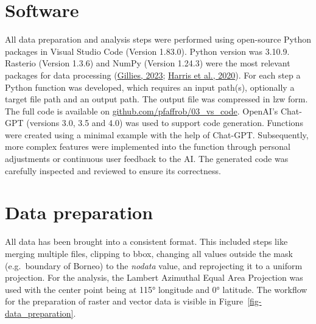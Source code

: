 \documentclass[
  letterpaper,
  DIV=11,
  numbers=noendperiod]{scrreprt}
\begin{document}
\hypertarget{software}{%
\section{Software}\label{software}}

All data preparation and analysis steps were performed using open-source
Python packages in Visual Studio Code (Version 1.83.0). Python version
was 3.10.9. Rasterio (Version 1.3.6) and NumPy (Version 1.24.3) were the
most relevant packages for data processing
(\protect\hyperlink{ref-gilliesRasterioDocumentation2023}{Gillies,
2023}; \protect\hyperlink{ref-harrisArrayProgrammingNumPy2020}{Harris et
al., 2020}). For each step a Python function was developed, which
requires an input path(s), optionally a target file path and an output
path. The output file was compressed in lzw form. The full code is
available on
\href{https://github.com/pfaffrob/03_vs_code}{github.com/pfaffrob/03\_vs\_code}.
OpenAI's Chat-GPT (versions 3.0, 3.5 and 4.0) was used to support code
generation. Functions were created using a minimal example with the help
of Chat-GPT. Subsequently, more complex features were implemented into
the function through personal adjustments or continuous user feedback to
the AI. The generated code was carefully inspected and reviewed to
ensure its correctness.

\hypertarget{data-preparation}{%
\section{Data preparation}\label{data-preparation}}

All data has been brought into a consistent format. This included steps
like merging multiple files, clipping to bbox, changing all values
outside the mask (e.g.~boundary of Borneo) to the \emph{nodata} value,
and reprojecting it to a uniform projection. For the analysis, the
Lambert Azimuthal Equal Area Projection was used with the center point
being at 115° longitude and 0° latitude. The workflow for the
preparation of raster and vector data is visible in
Figure~\ref{fig-data_preparation}.
\end{document}
